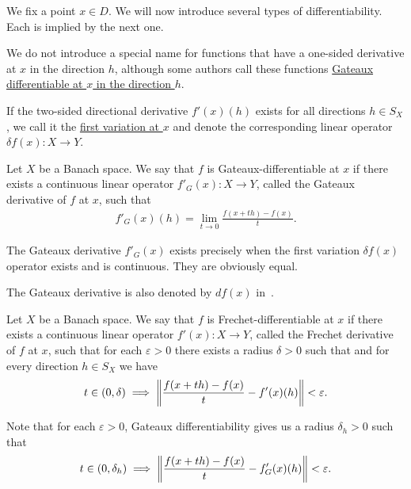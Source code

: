 \begin{definition}\label{def:differentiability}
  We fix a point $x \in D$. We will now introduce several types of differentiability. Each is implied by the next one.

  \begin{defenum}
    \item We do not introduce a special name for functions that have a one-sided derivative at $x$ in the direction $h$, although some authors call these functions \ul{Gateaux differentiable at $x$ in the direction $h$}. %

    \item\label{def:differentiability/two-sided}\cite[0.2.1]{Ioffe1974} If the two-sided directional derivative $f'(x)(h)$ exists for all directions $h \in S_X$, we call it the \ul{first variation at $x$} and denote the corresponding linear operator $\delta f(x): X \to Y$.

    \item\label{def:differentiability/gateaux}\cite[definition 1.12]{Phelps1993} Let $X$ be a Banach space. We say that $f$ is Gateaux-differentiable at $x$ if there exists a continuous linear operator $f'_G(x): X \to Y$, called the Gateaux derivative of $f$ at $x$, such that
    \begin{align*}
      f'_G(x)(h) = \lim_{t \to 0} \frac {f(x + th) - f(x)} t.
    \end{align*}

    The Gateaux derivative $f'_G(x)$ exists precisely when the first variation $\delta f(x)$ operator exists and is continuous. They are obviously equal.

    The Gateaux derivative is also denoted by $df(x)$ in~\cite[definition 1.12]{Phelps1993}.

    \item\label{def:differentiability/frechet}\cite[definition 1.12]{Phelps1993} Let $X$ be a Banach space. We say that $f$ is Frechet-differentiable at $x$ if there exists a continuous linear operator $f'(x): X \to Y$, called the Frechet derivative of $f$ at $x$, such that for each $\varepsilon > 0$ there exists a radius $\delta > 0$ such that and for every direction $h \in S_X$ we have
    \begin{align*}
      t \in (0, \delta) \implies \left\Vert  \frac {f(x + th) - f(x)} t - f'(x)(h) \right\Vert < \varepsilon.
    \end{align*}

    Note that for each $\varepsilon > 0$, Gateaux differentiability gives us a radius $\delta_h > 0$ such that
    \begin{align*}
      t \in (0, \delta_h) \implies \left\Vert  \frac {f(x + th) - f(x)} t - f_G'(x)(h) \right\Vert < \varepsilon.
    \end{align*}


\end{defenum}
\end{definition}
